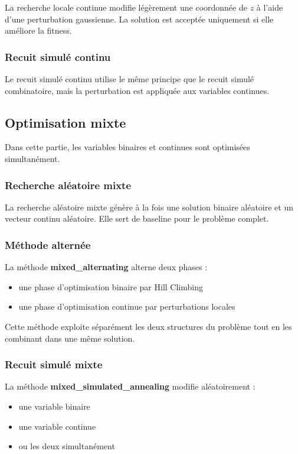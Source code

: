 \documentclass[a4paper,11pt]{article}
\begin{document}
La recherche locale continue modifie légèrement une coordonnée de $z$ à l'aide d'une perturbation gaussienne. 
La solution est acceptée uniquement si elle améliore la fitness.

\subsubsection{Recuit simulé continu}

Le recuit simulé continu utilise le même principe que le recuit simulé combinatoire, mais la perturbation est appliquée aux variables continues.

\subsection{Optimisation mixte}

Dans cette partie, les variables binaires et continues sont optimisées simultanément.

\subsubsection{Recherche aléatoire mixte}

La recherche aléatoire mixte génère à la fois une solution binaire aléatoire et un vecteur continu aléatoire. 
Elle sert de baseline pour le problème complet.

\subsubsection{Méthode alternée}

La méthode \textbf{mixed\_alternating} alterne deux phases :
\begin{itemize}
    \item une phase d'optimisation binaire par Hill Climbing
    \item une phase d'optimisation continue par perturbations locales
\end{itemize}

Cette méthode exploite séparément les deux structures du problème tout en les combinant dans une même solution.

\subsubsection{Recuit simulé mixte}

La méthode \textbf{mixed\_simulated\_annealing} modifie aléatoirement :
\begin{itemize}
    \item une variable binaire
    \item une variable continue
    \item ou les deux simultanément
\end{itemize}
\end{document}
